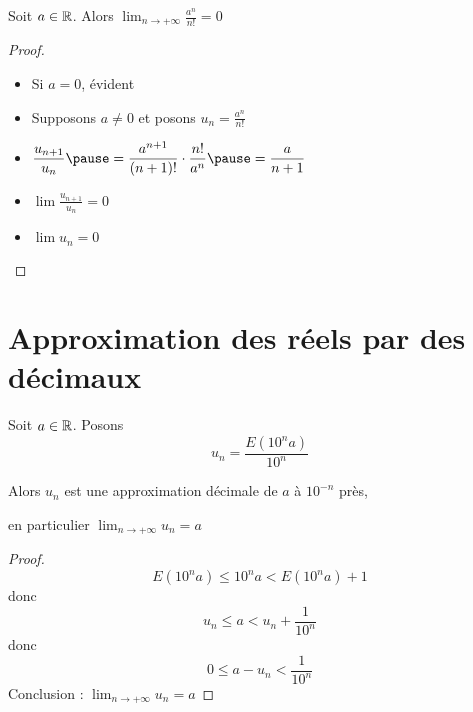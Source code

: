 \begin{frame}

\begin{corollaire}
\end{corollaire}
\pause
\begin{exemple}
Soit $a\in \mathbb{R}$. Alors $\displaystyle \lim_{n\to +\infty} \frac{a^n}{n!} =0$
\end{exemple}
\pause
\begin{proof}
\begin{itemize}
  \item Si $a=0$, évident
\pause
  \item Supposons $a\neq 0$ et posons $u_n= \frac{a^n}{n!}$
\pause
  \item $\displaystyle\frac{u_{n+1}}{u_n}\pause= \frac{a^{n+1}}{(n+1)!}\cdot \frac{n!}{a^n}\pause=\frac{a}{n+1}$
\pause
  \item $\lim \frac{u_{n+1}}{u_n} = 0$ 
 \pause 
  \item $\lim u_n =0$ \qedhere
  
\end{itemize}
\end{proof}

\end{frame}

\section{Approximation des réels par des décimaux}

\begin{frame}
\begin{proposition}
\label{prop:ecdecim}
  Soit $a\in \mathbb{R}$. Posons
  \[u_n = \frac{E(10^na)}{10^n} \]
  
   \hfil \hfil Alors $u_n$ est une approximation décimale de $a$ à $10^{-n}$ près, 
  
  
  \hfil \hfil en particulier $\lim_{n\to +\infty} u_n=a$
\end{proposition}
\pause

\begin{proof}

  \[E(10^na)\leq 10^na < E(10^na)+1\]
\pause  
donc
\[ u_n \leq a < u_n+\frac{1}{10^n} \]
\pause
donc
\[ 0 \leq a -u_n< \frac{1}{10^n} \]
\pause
Conclusion :  $\lim_{n\to +\infty} u_n=a$
\end{proof}

\end{frame}


